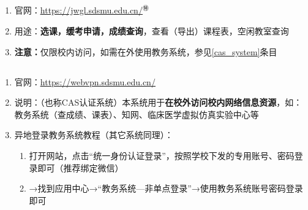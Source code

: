 \subsection[教务系统]{\textbf{}}
\label{academic_affairs_system}
\begin{enumerate}
    \item 官网：\uline{\href{https://jwgl.sdsmu.edu.cn/}{https://jwgl.sdsmu.edu.cn/}$^㊕$}
    \item 用途：\textbf{选课，缓考申请，成绩查询}，查看（导出）课程表，空闲教室查询
    \item \textbf{注意：}仅限校内访问，如需在外使用教务系统，参见\uline{\ref{cas_system}}条目
\end{enumerate}

\subsection[CAS资源访问控制系统（校内VPN）]{\textbf{}\footnotemark}
\label{cas_system}
\begin{enumerate}
    \item 官网：\uline{\href{https://webvpn.sdsmu.edu.cn/}{https://webvpn.sdsmu.edu.cn/}}
    \item 说明：（也称CAS认证系统）本系统用于\textbf{在校外访问校内网络信息资源}，如：教务系统（查成绩、课表）、知网、临床医学虚拟仿真实验中心\footnotemark 等
    \item 异地登录教务系统教程（其它系统同理）：
          \begin{enumerate}
              \item 打开网站，点击“统一身份认证登录”，按照学校下发的专用账号、密码登录即可（推荐绑定微信）
              \item →找到应用中心→“教务系统—非单点登录”\footnotemark →使用教务系统账号密码登录即可
          \end{enumerate}
\end{enumerate}

